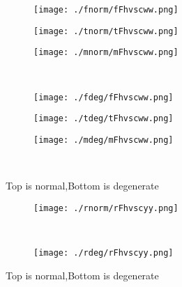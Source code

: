 \documentclass[aps,floats,floatfix,nofootinbib]{revtex4-1}
\begin{document}
\begin{center}
\begin{figure}
\begin{subfigure}{0.3\textwidth}
\texttt{[image: ./fnorm/fFhvscww.png]}
\label{}
\end{subfigure}
\begin{subfigure}{0.3\textwidth}
\texttt{[image: ./tnorm/tFhvscww.png]}
\label{}
\end{subfigure}
\begin{subfigure}{0.3\textwidth}
\texttt{[image: ./mnorm/mFhvscww.png]}
\label{}
\end{subfigure}\\
\begin{subfigure}{0.3\textwidth}
\texttt{[image: ./fdeg/fFhvscww.png]}
\label{}
\end{subfigure}
\begin{subfigure}{0.3\textwidth}
\texttt{[image: ./tdeg/tFhvscww.png]}
\label{}
\end{subfigure}
\begin{subfigure}{0.3\textwidth}
\texttt{[image: ./mdeg/mFhvscww.png]}
\label{}
\end{subfigure}\\
\caption{Top is normal,Bottom is degenerate}
\end{figure}
\end{center}

\begin{center}
\begin{figure}
\begin{subfigure}{0.95\textwidth}
\texttt{[image: ./rnorm/rFhvscyy.png]}
\label{}
\end{subfigure}\\
\begin{subfigure}{0.95\textwidth}
\texttt{[image: ./rdeg/rFhvscyy.png]}
\label{}
\end{subfigure}
\caption{Top is normal,Bottom is degenerate}
\end{figure}
\end{center}
\end{document}
